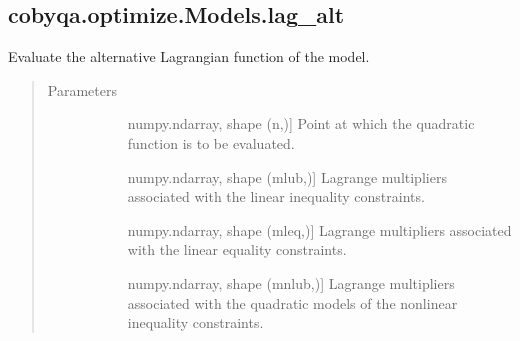 \documentclass[letterpaper,10pt,english]{sphinxmanual}
\begin{document}
\begin{fulllineitems}
\begin{fulllineitems}
\begin{quote}
\begin{description}
\begin{description}
\end{description}

\end{description}\end{quote}

\end{fulllineitems}



\subsection{cobyqa.optimize.Models.lag\_alt}
\label{\detokenize{refs/generated/cobyqa.optimize.Models.lag_alt:cobyqa-optimize-models-lag-alt}}\label{\detokenize{refs/generated/cobyqa.optimize.Models.lag_alt::doc}}

\begin{fulllineitems}
\label{\detokenize{refs/generated/cobyqa.optimize.Models.lag_alt:cobyqa.optimize.Models.lag_alt}}
\sphinxAtStartPar
Evaluate the alternative Lagrangian function of the model.
\begin{quote}\begin{description}
\item[{Parameters}] \leavevmode\begin{description}
\item[{}] \leavevmode{[}numpy.ndarray, shape (n,){]}
\sphinxAtStartPar
Point at which the quadratic function is to be evaluated.

\item[{}] \leavevmode{[}numpy.ndarray, shape (mlub,){]}
\sphinxAtStartPar
Lagrange multipliers associated with the linear inequality
constraints.

\item[{}] \leavevmode{[}numpy.ndarray, shape (mleq,){]}
\sphinxAtStartPar
Lagrange multipliers associated with the linear equality
constraints.

\item[{}] \leavevmode{[}numpy.ndarray, shape (mnlub,){]}
\sphinxAtStartPar
Lagrange multipliers associated with the quadratic models of the
nonlinear inequality constraints.


\end{description}
\end{description}
\end{quote}
\end{fulllineitems}
\end{fulllineitems}
\end{document}
